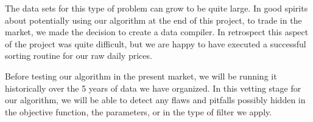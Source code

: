 The data sets for this type of problem can grow to be quite large.  In good spirits about potentially using our algorithm at the end of this project, to trade in the market, we made the decision to create a data compiler.  In retrospect this aspect of the project was quite difficult, but we are happy to have executed a successful sorting routine for our raw daily prices.  

Before testing our algorithm in the present market, we will be running it historically over the 5 years of data we have organized.  In this vetting stage for our algorithm, we will be able to detect any flaws and pitfalls possibly hidden in the objective function, the parameters, or in the type of filter we apply.  